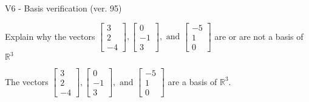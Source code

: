 \begin{exercise}
  \begin{exerciseTitle}V6 - Basis verification (ver. 95)\end{exerciseTitle}
  \begin{exerciseStatement}
    Explain why the vectors \(\left[\begin{array}{r}
3 \\
2 \\
-4
\end{array}\right] , \left[\begin{array}{r}
0 \\
-1 \\
3
\end{array}\right] , \text{ and } \left[\begin{array}{r}
-5 \\
1 \\
0
\end{array}\right]\) are or are not a basis of \(\mathbb{R}^3\)	


  \end{exerciseStatement}
  \begin{exerciseAnswer}
   The vectors \(\left[\begin{array}{r}
3 \\
2 \\
-4
\end{array}\right] , \left[\begin{array}{r}
0 \\
-1 \\
3
\end{array}\right] , \text{ and } \left[\begin{array}{r}
-5 \\
1 \\
0
\end{array}\right]\) 
  	 are  a basis of \(\mathbb{R}^3\).
  


  \end{exerciseAnswer}
\end{exercise}